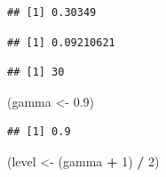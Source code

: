 \documentclass[
  12pt,
]{book}
\newenvironment{Shaded}{\begin{snugshade}}{\end{snugshade}}
\newcommand{\DecValTok}[1]{\textcolor[rgb]{0.00,0.00,0.81}{#1}}
\newcommand{\FloatTok}[1]{\textcolor[rgb]{0.00,0.00,0.81}{#1}}
\newcommand{\KeywordTok}[1]{\textcolor[rgb]{0.13,0.29,0.53}{\textbf{#1}}}
\newcommand{\NormalTok}[1]{#1}
\newcommand{\OperatorTok}[1]{\textcolor[rgb]{0.81,0.36,0.00}{\textbf{#1}}}
\newcommand{\StringTok}[1]{\textcolor[rgb]{0.31,0.60,0.02}{#1}}
\begin{document}
\begin{Shaded}
\end{Shaded}

\begin{verbatim}
## [1] 0.30349
\end{verbatim}

\begin{Shaded}
\end{Shaded}

\begin{verbatim}
## [1] 0.09210621
\end{verbatim}

\begin{Shaded}
\end{Shaded}

\begin{verbatim}
## [1] 30
\end{verbatim}

\begin{Shaded}
\begin{Highlighting}[]
\NormalTok{(gamma \textless{}{-}}\StringTok{ }\FloatTok{0.9}\NormalTok{)}
\end{Highlighting}
\end{Shaded}

\begin{verbatim}
## [1] 0.9
\end{verbatim}

\begin{Shaded}
\begin{Highlighting}[]
\NormalTok{(level \textless{}{-}}\StringTok{ }\NormalTok{(gamma }\OperatorTok{+}\StringTok{ }\DecValTok{1}\NormalTok{) }\OperatorTok{/}\StringTok{ }\DecValTok{2}\NormalTok{)}
\end{Highlighting}
\end{Shaded}
\end{document}
